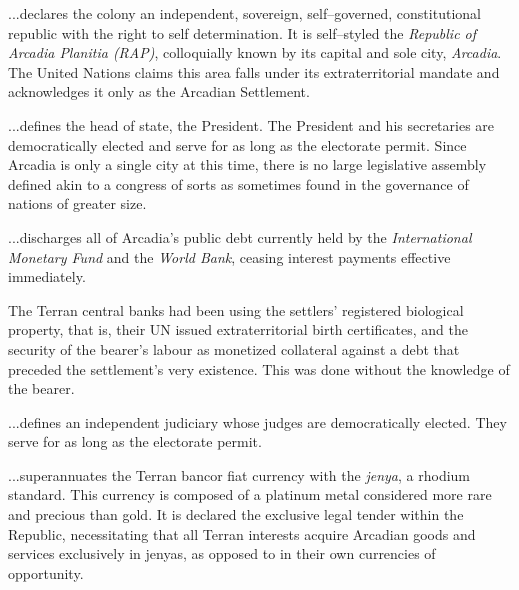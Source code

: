 
\startarticle
\item %

...declares the colony an independent, sovereign, self--governed, constitutional republic with the right to self determination. It is self--styled the {\it Republic of Arcadia Planitia (RAP)}, colloquially known by its capital and sole city, {\it Arcadia}. The United Nations claims this area falls under its extraterritorial mandate and acknowledges it only as the Arcadian Settlement.

\item %

...defines the head of state, the President. The President and his secretaries are democratically elected and serve for as long as the electorate permit. Since Arcadia is only a single city at this time, there is no large legislative assembly defined akin to a congress of sorts as sometimes found in the governance of nations of greater size.

\item %

...discharges all of Arcadia's public debt currently held by the {\it International Monetary Fund} and the {\it World Bank}, ceasing interest payments effective immediately. 

The Terran central banks had been using the settlers' registered biological property, that is, their UN issued extraterritorial birth certificates, and the security of the bearer's labour as monetized collateral against a debt that preceded the settlement's very existence. This was done without the knowledge of the bearer.

\item %

...defines an independent judiciary whose judges are democratically elected. They serve for as long as the electorate permit.
\stoparticle

\startarticle[start=7]
\item %

...superannuates the Terran bancor fiat currency with the {\it jenya}, a rhodium standard. This currency is composed of a platinum metal considered more rare and precious than gold. It is declared the exclusive legal tender within the Republic, necessitating that all Terran interests acquire Arcadian goods and services exclusively in jenyas, as opposed to in their own currencies of opportunity.

